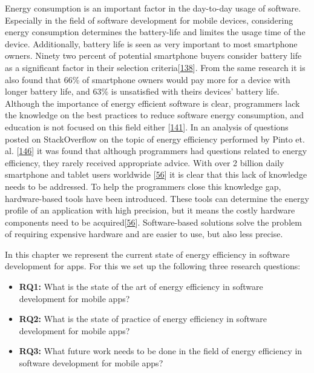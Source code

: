 \documentclass[]{book}
\providecommand{\tightlist}{%
  \setlength{\itemsep}{0pt}\setlength{\parskip}{0pt}}
\begin{document}
Energy consumption is an important factor in the day-to-day usage of
software. Especially in the field of software development for mobile
devices, considering energy consumption determines the battery-life and
limites the usage time of the device. Additionally, battery life is seen
as very important to most smartphone owners. Ninety two percent of
potential smartphone buyers consider battery life as a significant
factor in their selection
criteria{[}\protect\hyperlink{ref-OOC2017}{138}{]}. From the same
research it is also found that 66\% of smartphone owners would pay more
for a device with longer battery life, and 63\% is unsatisfied with
theirs devices' battery life. Although the importance of energy
efficient software is clear, programmers lack the knowledge on the best
practices to reduce software energy consumption, and education is not
focused on this field either {[}\protect\hyperlink{ref-PHA2016}{141}{]}.
In an analysis of questions posted on StackOverflow on the topic of
energy efficiency performed by Pinto et. al.
{[}\protect\hyperlink{ref-PCL2014}{146}{]} it was found that although
programmers had questions related to energy efficiency, they rarely
received appropriate advice. With over 2 billion daily smartphone and
tablet users worldwide {[}\protect\hyperlink{ref-NPPPZL2017}{56}{]} it
is clear that this lack of knowledge needs to be addressed. To help the
programmers close this knowledge gap, hardware-based tools have been
introduced. These tools can determine the energy profile of an
application with high precision, but it means the costly hardware
components need to be
acquired{[}\protect\hyperlink{ref-NPPPZL2017}{56}{]}. Software-based
solutions solve the problem of requiring expensive hardware and are
easier to use, but also less precise.

In this chapter we represent the current state of energy efficiency in
software development for apps. For this we set up the following three
research questions:

\begin{itemize}
\tightlist
\item
  \textbf{RQ1:} What is the state of the art of energy efficiency in
  software development for mobile apps?
\item
  \textbf{RQ2:} What is the state of practice of energy efficiency in
  software development for mobile apps?
\item
  \textbf{RQ3:} What future work needs to be done in the field of energy
  efficiency in software development for mobile apps?
\end{itemize}
\end{document}
